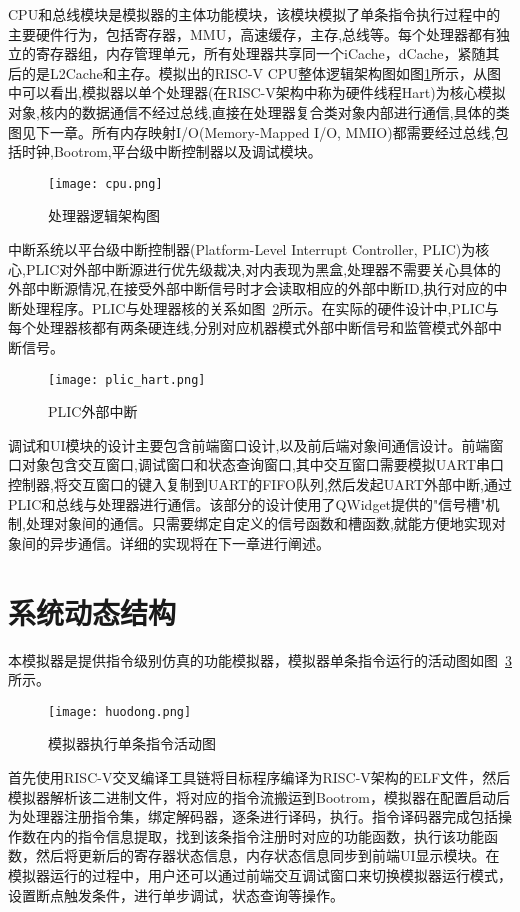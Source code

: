 CPU和总线模块是模拟器的主体功能模块，该模块模拟了单条指令执行过程中的主要硬件行为，包括寄存器，MMU，高速缓存，主存,总线等。每个处理器都有独立的寄存器组，内存管理单元，所有处理器共享同一个iCache，dCache，紧随其后的是L2Cache和主存。模拟出的RISC-V CPU整体逻辑架构图如图\ref{fig:cpu}所示，从图中可以看出,模拟器以单个处理器(在RISC-V架构中称为硬件线程Hart)为核心模拟对象,核内的数据通信不经过总线,直接在处理器复合类对象内部进行通信,具体的类图见下一章。所有内存映射I/O(Memory-Mapped I/O, MMIO)都需要经过总线,包括时钟,Bootrom,平台级中断控制器以及调试模块。
\begin{figure}[H]
  \centering
  \texttt{[image: cpu.png]}
  \caption{处理器逻辑架构图}
  \label{fig:cpu}
\end{figure}


中断系统以平台级中断控制器(Platform-Level Interrupt Controller, PLIC)为核心,PLIC对外部中断源进行优先级裁决,对内表现为黑盒,处理器不需要关心具体的外部中断源情况,在接受外部中断信号时才会读取相应的外部中断ID,执行对应的中断处理程序。PLIC与处理器核的关系如图~\ref{fig:plic-to-hart}所示。在实际的硬件设计中,PLIC与每个处理器核都有两条硬连线,分别对应机器模式外部中断信号和监管模式外部中断信号。
\begin{figure}[H]
  \centering
  \texttt{[image: plic\_hart.png]}
  \caption{PLIC外部中断}
  \label{fig:plic-to-hart}
\end{figure}


调试和UI模块的设计主要包含前端窗口设计,以及前后端对象间通信设计。前端窗口对象包含交互窗口,调试窗口和状态查询窗口,其中交互窗口需要模拟UART串口控制器,将交互窗口的键入复制到UART的FIFO队列,然后发起UART外部中断,通过PLIC和总线与处理器进行通信。该部分的设计使用了QWidget提供的"信号槽"机制,处理对象间的通信。只需要绑定自定义的信号函数和槽函数,就能方便地实现对象间的异步通信。详细的实现将在下一章进行阐述。

\section{系统动态结构}
本模拟器是提供指令级别仿真的功能模拟器，模拟器单条指令运行的活动图如图~\ref{fig:sim-seq1}所示。
\begin{figure}[H]
  \centering
  \texttt{[image: huodong.png]}
  \caption{模拟器执行单条指令活动图}
  \label{fig:sim-seq1}
\end{figure}


首先使用RISC-V交叉编译工具链将目标程序编译为RISC-V架构的ELF文件，然后模拟器解析该二进制文件，将对应的指令流搬运到Bootrom，模拟器在配置启动后为处理器注册指令集，绑定解码器，逐条进行译码，执行。指令译码器完成包括操作数在内的指令信息提取，找到该条指令注册时对应的功能函数，执行该功能函数，然后将更新后的寄存器状态信息，内存状态信息同步到前端UI显示模块。在模拟器运行的过程中，用户还可以通过前端交互调试窗口来切换模拟器运行模式，设置断点触发条件，进行单步调试，状态查询等操作。


